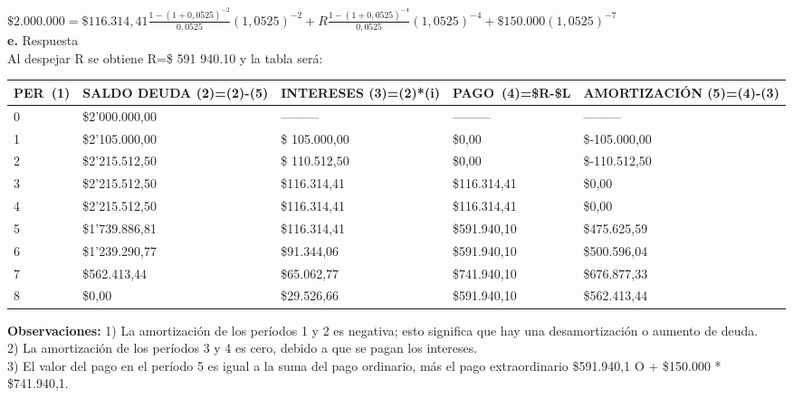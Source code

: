 	$\$ 2.000.000=\$ 116.314,41  \frac{1-(1+0,0525)^{-2}}{0,0525}(1,0525)^{-2}+R \frac{1-(1+0,0525)^{-4}}{0,0525}(1,0525)^{-4}+\$ 150.000 (1,0525)^{-7}$\\
	

\textbf{e.}	Respuesta\\
Al despejar R se obtiene R=\$ 591 940.10 y la tabla será: 
\begin{spacing}{1.1}
    \begin{center}
        \begin{tabular}{|p{1cm}|p{2cm}|p{2cm}|p{2cm}|p{3cm}|}
        \hline 
        \rowcolor{white!50}
            \textbf{PER\ (1)} & \textbf{SALDO DEUDA (2)=(2)-(5)} & \textbf{INTERESES  (3)=(2)*(i)}& \textbf{PAGO\ (4)=\$R-\$L }& \textbf{AMORTIZACIÓN  (5)=(4)-(3)} \\ \hline                        

            0 & \$2'000.000,00 & --------- & --------- & ---------\\ \hline 
            1 & \$2'105.000,00  &\$ 105.000,00  & \$0,00  & \$-105.000,00 \\ \hline
            2 & \$2'215.512,50  &\$ 110.512,50  & \$0,00  & \$-110.512,50 \\ \hline
            3 & \$2'215.512,50 & \$116.314,41  & \$116.314,41 & \$0,00\\ \hline
            4 & \$2'215.512,50  & \$116.314,41  & \$116.314,41  & \$0,00\\ \hline
            5 & \$1'739.886,81  & \$116.314,41  & \$591.940,10  & \$475.625,59 \\ \hline
            6 & \$1'239.290,77  & \$91.344,06  & \$591.940,10  & \$500.596,04 \\ \hline
            7 & \$562.413,44  & \$65.062,77  & \$741.940,10  & \$676.877,33 \\ \hline
            8 & \$0,00  & \$29.526,66  & \$591.940,10  & \$562.413,44 \\ \hline

 
\end{tabular}
\end{center}
\end{spacing}
\textbf{Observaciones: }
1)	La amortización de los períodos 1 y 2 es negativa; esto significa que hay una desamortización o aumento de deuda.\\ 
2)	La amortización de los períodos 3 y 4 es cero, debido a que se pagan los intereses.\\
3)	 El valor del pago en el período 5 es igual a la suma del pago ordinario, más el pago extraordinario \$591.940,1 O + \$150.000 * \$741.940,1.\\

